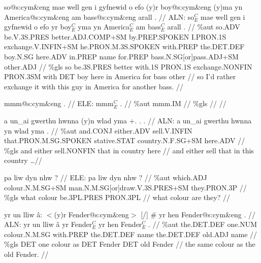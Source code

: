 \documentclass[a4paper,10pt]{article}
\begin{document}
\ex
\begingl[lingstyle=gergl]
\glchat so@s:cym\&eng mae well gen i gyfnewid o efo (y)r boy@s:cym\&eng (y)ma yn America@s:cym\&eng am bass@s:cym\&eng arall . //
\glsurface ALN:  so$^{C}_{E}$ mae well gen i gyfnewid o efo yr boy$^{C}_{E}$ yma yn America$^{C}_{E}$ am bass$^{C}_{E}$ arall .  //
\glauto \%aut  so{\scriptsize .ADV} be{\scriptsize .V.3S.PRES} better{\scriptsize .ADJ.COMP+SM} by{\scriptsize .PREP.SPOKEN} I{\scriptsize .PRON.1S} exchange{\scriptsize .V.INFIN+SM} he{\scriptsize .PRON.M.3S.SPOKEN} with{\scriptsize .PREP} the{\scriptsize .DET.DEF} boy{\scriptsize .N.SG} here{\scriptsize .ADV} in{\scriptsize .PREP} name for{\scriptsize .PREP} bass{\scriptsize .N.SG[or]pass.ADJ+SM} other{\scriptsize .ADJ}   //
\glmanual \%gls  so be{\scriptsize .3S.PRES} better with{\scriptsize .1S} PRON{\scriptsize .1S} exchange{\scriptsize .NONFIN} PRON{\scriptsize .3SM} with DET boy here in America for bass other   //
\gleng so I'd rather exchange it with this guy in America for another bass. //
\endgl
\xe

\ex
\begingl[lingstyle=gergl]
\glchat mmm@s:cym\&eng . //
\glsurface ELE:  mmm$^{C}_{E}$ .  //
\glauto \%aut  mmm{\scriptsize .IM}   //
\glmanual \%gls     //
\gleng  //
\endgl
\xe

\ex
\begingl[lingstyle=gergl]
\glchat a un\_ai gwerthu hwnna (y)n wlad yma +. . . //
\glsurface ALN:  a un\_ai gwerthu hwnna yn wlad yma .  //
\glauto \%aut  and{\scriptsize .CONJ} either{\scriptsize .ADV} sell{\scriptsize .V.INFIN} that{\scriptsize .PRON.M.SG.SPOKEN} stative{\scriptsize .STAT} country{\scriptsize .N.F.SG+SM} here{\scriptsize .ADV}   //
\glmanual \%gls  and either sell{\scriptsize .NONFIN} that in country here   //
\gleng and either sell that in this country \dots  //
\endgl
\xe

\ex
\begingl[lingstyle=gergl]
\glchat pa liw dyn nhw ? //
\glsurface ELE:  pa liw dyn nhw ?  //
\glauto \%aut  which{\scriptsize .ADJ} colour{\scriptsize .N.M.SG+SM} man{\scriptsize .N.M.SG[or]draw.V.3S.PRES+SM} they{\scriptsize .PRON.3P}   //
\glmanual \%gls  what colour be{\scriptsize .3PL.PRES} PRON{\scriptsize .3PL}   //
\gleng what colour are they? //
\endgl
\xe

\ex
\begingl[lingstyle=gergl]
\glchat yr un lliw â: $<$(y)r Fender@s:cym\&eng$>$ [/] \# yr hen Fender@s:cym\&eng . //
\glsurface ALN:  yr un lliw â yr Fender$^{C}_{E}$ yr hen Fender$^{C}_{E}$ .  //
\glauto \%aut  the{\scriptsize .DET.DEF} one{\scriptsize .NUM} colour{\scriptsize .N.M.SG} with{\scriptsize .PREP} the{\scriptsize .DET.DEF} name the{\scriptsize .DET.DEF} old{\scriptsize .ADJ} name   //
\glmanual \%gls  DET one colour as DET Fender DET old Fender   //
\gleng the same colour as the old Fender. //
\endgl
\xe
\end{document}
